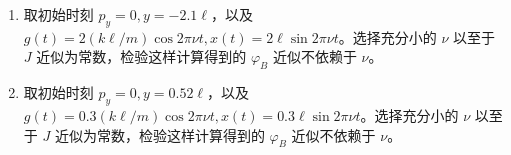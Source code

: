 \begin{enumerate}[resume]
\item 取初始时刻 $p_y=0,y=-2.1\ell$，以及 $g(t)=2(k\ell/m)\cos2\pi\nu t,x(t)=2\ell\sin2\pi\nu t$。选择充分小的 $\nu$ 以至于 $J$ 近似为常数，检验这样计算得到的 $\varphi_B$ 近似不依赖于 $\nu$。
\item 取初始时刻 $p_y=0,y=0.52\ell$，以及 $g(t)=0.3(k\ell/m)\cos2\pi\nu t,x(t)=0.3\ell\sin2\pi\nu t$。选择充分小的 $\nu$ 以至于 $J$ 近似为常数，检验这样计算得到的 $\varphi_B$ 近似不依赖于 $\nu$。
\end{enumerate}

